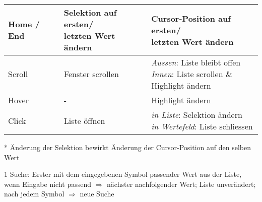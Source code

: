 \begin{table}[!htb]
\begin{adjustbox}{max width=0.95\textwidth}
\begin{threeparttable}
\begin{tabular}{ l || l | l }
                \hline
                Home / End & \tbbr{Selektion auf ersten/ \\ 
                                   letzten Wert ändern}   & \tbbr{Cursor-Position auf ersten/ \\ 
                                                                  letzten Wert ändern}                   \\
                \hline \hline
                Scroll     & Fenster scrollen             & \tbbr{\emph{Aussen}: Liste bleibt offen \\
                                                                  \emph{Innen}: Liste scrollen \& \\ 
                                                                                Highlight ändern}        \\
                \hline
                Hover      & -                            & Highlight ändern                             \\
                \hline
                Click      & Liste öffnen                 & \tbbr{\emph{in Liste}: Selektion ändern \\
                                                                  \emph{in Wertefeld}: Liste schliessen} \\
                \hline
            \end{tabular}
            \begin{tablenotes}
                \scriptsize
                \item[*] Änderung der Selektion bewirkt Änderung der Cursor-Position auf den selben Wert
                \item
                \item[1] Suche: Erster mit dem eingegebenen Symbol passender Wert aus der Liste, wenn Eingabe nicht passend $\Rightarrow$ nächster nachfolgender Wert; 
                                Liste unverändert; nach jedem Symbol $\Rightarrow$ neue Suche
            \end{tablenotes}
        \end{threeparttable}
    \end{adjustbox}
\end{table}
